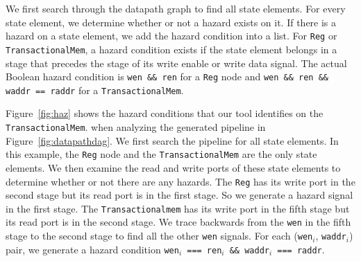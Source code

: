 We first search through the datapath graph to find all state
elements. For every state element, we determine whether or not a
hazard exists on it. If there is a hazard on a state element, we add
the hazard condition into a list. For {\tt Reg} or {\tt TransactionalMem}, a
hazard condition exists if the state element belongs in a stage that precedes the
stage of its write enable or write data signal. The actual Boolean
hazard condition is {\tt wen \&\& ren} for a {\tt Reg} node and
{\tt wen \&\& ren \&\& waddr == raddr} for a {\tt TransactionalMem}.

Figure~\ref{fig:haz} shows the hazard conditions that our tool
identifies on the {\tt TransactionalMem}. when analyzing the generated pipeline in
Figure~\ref{fig:datapathdag}. We first search the pipeline for all
state elements. In this example, the {\tt Reg} node and the 
{\tt TransactionalMem} are the only state elements. We then examine
the read and write ports of these state elements to determine whether
or not there are any hazards. The {\tt Reg} has its write port in the
second stage but its read port is in the first stage. So we generate a
hazard signal in the first stage. The {\tt Transactionalmem} has its
write port in the fifth stage but its read port is in the second
stage. We trace backwards from the {\tt wen} in the fifth stage to the
second stage to find all the other {\tt wen} signals. For each 
({\tt wen}$_i$, {\tt waddr}$_i$) pair, we generate a hazard condition
{\tt wen$_i$ === ren$_i$ \&\& waddr$_i$ === raddr}.

